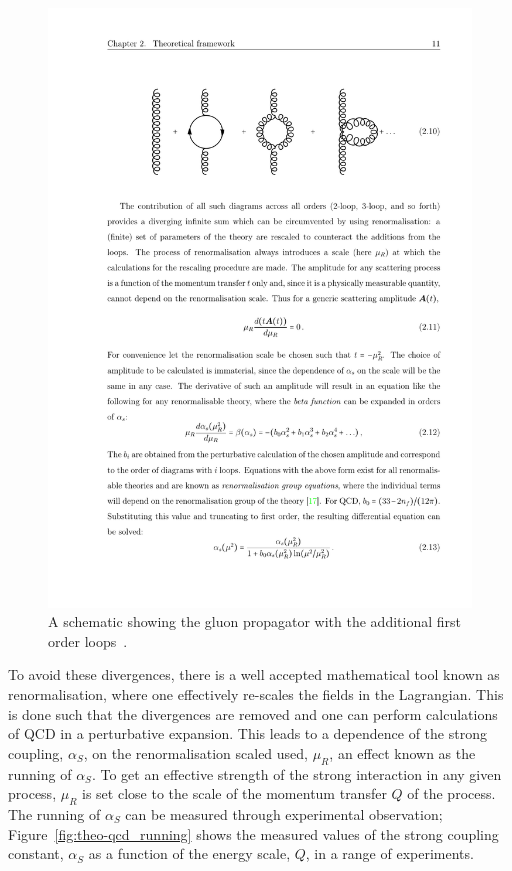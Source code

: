 \begin{figure}[!hbt]
  \begin{center}
    \includegraphics[width=0.7\linewidth, angle=0]{figs/Theory/qcd_gluon_loop.pdf}
  \end{center}
  \caption[A schematic showing the gluon propagator with the additional first order loops.]
  {A schematic showing the gluon propagator with the additional first order loops~\cite{det-thesis_kate}.}
  \label{fig:theo-qcd_gluon}
\end{figure}

To avoid these divergences, there is a well accepted mathematical tool known as renormalisation,
where one effectively re-scales the fields in the Lagrangian.
This is done such that the divergences are removed
and one can perform calculations of QCD in a perturbative expansion.
This leads to a dependence of the strong coupling, $\alpha_S$, on the renormalisation scaled used, $\mu_R$,
an effect known as the running of $\alpha_S$.
To get an effective strength of the strong interaction in any given process,
$\mu_R$ is set close to the scale of the momentum transfer $Q$ of the process.
The running of $\alpha_S$ can be measured through experimental observation;
Figure~\ref{fig:theo-qcd_running} shows the measured values of
the strong coupling constant, $\alpha_S$ as a function of the energy scale, $Q$, in a range of experiments.

